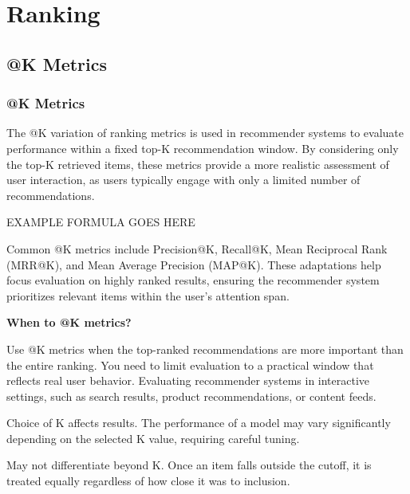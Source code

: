 \chapter{Ranking}

\clearpage
\thispagestyle{rankingstyle}
\section{@K Metrics}
\subsection{@K Metrics}

The @K variation of ranking metrics is used in recommender systems to evaluate performance within a fixed top-K recommendation
window. By considering only the top-K retrieved items, these metrics provide a more realistic assessment of user interaction,
as users typically engage with only a limited number of recommendations.

\begin{center}
    EXAMPLE FORMULA GOES HERE
\end{center}

Common @K metrics include Precision@K, Recall@K, Mean Reciprocal Rank (MRR@K), and Mean Average Precision (MAP@K).
These adaptations help focus evaluation on highly ranked results, ensuring the recommender system prioritizes relevant
items within the user's attention span.

\textbf{When to @K metrics?}

Use @K metrics when the top-ranked recommendations are more important than the entire ranking. You need to limit evaluation
to a practical window that reflects real user behavior. Evaluating recommender systems in interactive settings,
such as search results, product recommendations, or content feeds.

{
    \item Choice of K affects results. The performance of a model may vary significantly depending on the selected K value,
    requiring careful tuning.
    \item May not differentiate beyond K. Once an item falls outside the cutoff, it is treated equally regardless of
    how close it was to inclusion.
}

